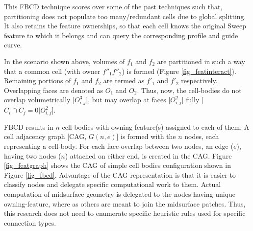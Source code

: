 This FBCD technique scores over some of the past techniques such that, partitioning does not populate too many/redundant cells due to global splitting. It also retains the feature ownerships, so that each cell knows the original Sweep feature to which it belongs and can query the corresponding profile and guide curve.

In the scenario shown above, volumes of $f_1$ and $f_2$ are partitioned in such a way that a common cell (with owner $f''_1f''_2$) is formed (Figure \ref{fig_featinteract}). Remaining portions of $f_1$ and $f_2$ are termed as $f'_1$ and $f'_2$ respectively.  Overlapping faces are denoted as $O_1$ and $O_2$. Thus, now, the cell-bodies do not overlap volumetrically [$O_{i,j}^3$], but may overlap at faces [$O_{i,j}^2$] fully [ $C_i \cap C_j = 0| O_{i,j}^2$].

FBCD results in $n$ cell-bodies with owning-feature(s) assigned to each of them. A cell adjacency graph [CAG, $G(n,e)$] is formed with the $n$ nodes, each representing a cell-body. For each face-overlap between two nodes, an edge ($e$), having two nodes ($n$) attached on either end, is created in the CAG.  Figure \ref{fig_featgraph} shows the CAG of simple cell bodies configuration shown in Figure \ref{fig_fbcd}. Advantage of the CAG representation is that it is easier to classify nodes and delegate specific computational work to them. Actual computation of midsurface geometry is delegated to the nodes having unique owning-feature, where as others are meant to join the midsurface patches. Thus, this research does not need to enumerate specific heuristic rules used for specific connection types.


